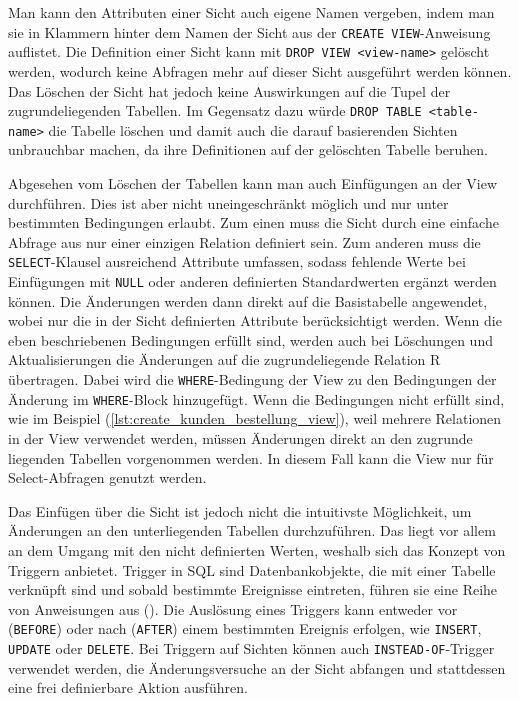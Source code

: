 

Man kann den Attributen einer Sicht auch eigene Namen vergeben, indem man sie in Klammern hinter dem Namen der Sicht aus der \texttt{CREATE VIEW}-Anweisung auflistet.
Die Definition einer Sicht kann mit \texttt{DROP VIEW <view-name>} gelöscht werden, wodurch keine Abfragen mehr auf dieser Sicht ausgeführt werden können.
Das Löschen der Sicht hat jedoch keine Auswirkungen auf die Tupel der zugrundeliegenden Tabellen.
Im Gegensatz dazu würde \texttt{DROP TABLE <table-name>} die Tabelle löschen und damit auch die darauf basierenden Sichten unbrauchbar machen, da ihre Definitionen auf der gelöschten Tabelle beruhen.

Abgesehen vom Löschen der Tabellen kann man auch Einfügungen an der View durchführen.
Dies ist aber nicht uneingeschränkt möglich und nur unter bestimmten Bedingungen erlaubt.
Zum einen muss die Sicht durch eine einfache Abfrage aus nur einer einzigen Relation definiert sein.
Zum anderen muss die \texttt{SELECT}-Klausel ausreichend Attribute umfassen, sodass fehlende Werte bei Einfügungen mit \texttt{NULL} oder anderen definierten Standardwerten ergänzt werden können.
Die Änderungen werden dann direkt auf die Basistabelle angewendet, wobei nur die in der Sicht definierten Attribute berücksichtigt werden.
Wenn die eben beschriebenen Bedingungen erfüllt sind, werden auch bei Löschungen und Aktualisierungen die Änderungen auf die zugrundeliegende Relation R übertragen.
Dabei wird die \texttt{WHERE}-Bedingung der View zu den Bedingungen der Änderung im \texttt{WHERE}-Block hinzugefügt.
Wenn die Bedingungen nicht erfüllt sind, wie im Beispiel (\ref{lst:create_kunden_bestellung_view}), weil mehrere Relationen in der View verwendet werden, müssen Änderungen direkt an den zugrunde liegenden Tabellen vorgenommen werden.
In diesem Fall kann die View nur für Select-Abfragen genutzt werden.

Das Einfügen über die Sicht ist jedoch nicht die intuitivste Möglichkeit, um Änderungen an den unterliegenden Tabellen durchzuführen.
Das liegt vor allem an dem Umgang mit den nicht definierten Werten, weshalb sich das Konzept von Triggern anbietet.
Trigger in SQL sind Datenbankobjekte, die mit einer Tabelle verknüpft sind und sobald bestimmte Ereignisse eintreten, führen sie eine Reihe von Anweisungen aus (\cite{trigger_erklaerung}).
Die Auslösung eines Triggers kann entweder vor (\texttt{BEFORE}) oder nach (\texttt{AFTER}) einem bestimmten Ereignis erfolgen, wie \texttt{INSERT}, \texttt{UPDATE} oder \texttt{DELETE}.
Bei Triggern auf Sichten können auch \texttt{INSTEAD-OF}-Trigger verwendet werden, die Änderungsversuche an der Sicht abfangen und stattdessen eine frei definierbare Aktion ausführen.

